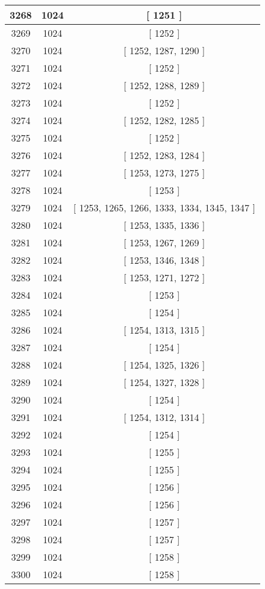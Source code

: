 \begin{center}
\begin{longtable}[H]{|| c c c ||}
\hline
3268 & 1024 & [ 1251 ] \\ 
\hline
3269 & 1024 & [ 1252 ] \\ 
\hline
3270 & 1024 & [ 1252, 1287, 1290 ] \\ 
\hline
3271 & 1024 & [ 1252 ] \\ 
\hline
3272 & 1024 & [ 1252, 1288, 1289 ] \\ 
\hline
3273 & 1024 & [ 1252 ] \\ 
\hline
3274 & 1024 & [ 1252, 1282, 1285 ] \\ 
\hline
3275 & 1024 & [ 1252 ] \\ 
\hline
3276 & 1024 & [ 1252, 1283, 1284 ] \\ 
\hline
3277 & 1024 & [ 1253, 1273, 1275 ] \\ 
\hline
3278 & 1024 & [ 1253 ] \\ 
\hline
3279 & 1024 & [ 1253, 1265, 1266, 1333, 1334, 1345, 1347 ] \\ 
\hline
3280 & 1024 & [ 1253, 1335, 1336 ] \\ 
\hline
3281 & 1024 & [ 1253, 1267, 1269 ] \\ 
\hline
3282 & 1024 & [ 1253, 1346, 1348 ] \\ 
\hline
3283 & 1024 & [ 1253, 1271, 1272 ] \\ 
\hline
3284 & 1024 & [ 1253 ] \\ 
\hline
3285 & 1024 & [ 1254 ] \\ 
\hline
3286 & 1024 & [ 1254, 1313, 1315 ] \\ 
\hline
3287 & 1024 & [ 1254 ] \\ 
\hline
3288 & 1024 & [ 1254, 1325, 1326 ] \\ 
\hline
3289 & 1024 & [ 1254, 1327, 1328 ] \\ 
\hline
3290 & 1024 & [ 1254 ] \\ 
\hline
3291 & 1024 & [ 1254, 1312, 1314 ] \\ 
\hline
3292 & 1024 & [ 1254 ] \\ 
\hline
3293 & 1024 & [ 1255 ] \\ 
\hline
3294 & 1024 & [ 1255 ] \\ 
\hline
3295 & 1024 & [ 1256 ] \\ 
\hline
3296 & 1024 & [ 1256 ] \\ 
\hline
3297 & 1024 & [ 1257 ] \\ 
\hline
3298 & 1024 & [ 1257 ] \\ 
\hline
3299 & 1024 & [ 1258 ] \\ 
\hline
3300 & 1024 & [ 1258 ] \\ 

\end{longtable}
\end{center}
